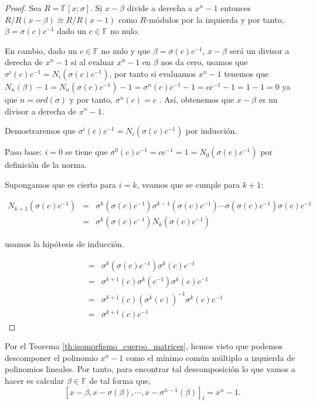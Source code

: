 \begin{proof}
    Sea $R = \mathbb{F}[x;\sigma] $. Si $x - \beta$ divide a derecha a $x^n-1$ entonces $R/R(x-\beta) \cong R/R(x-1) $ como $R$-módulos por la izquierda y por tanto, $\beta = \sigma(c)c^{-1}$ dado un $c \in \mathbb{F}$ no nulo. 
    
    En cambio, dado un $c \in \mathbb{F}$ no nulo y que $\beta = \sigma(c)c^{-1}$, $x-\beta$ será un divisor a derecha de $x^n-1$ si al evaluar $x^n-1$ en $\beta$ nos da cero,  usamos que $\sigma^i(c)c^{-1} = N_i(\sigma(c)c^{-1})$, por tanto si evaluamos $x^n-1$ tenemos que $N_n(\beta)-1 = N_n(\sigma(c)c^{-1}) - 1 = \sigma^n(c)c^{-1} - 1 = cc^{-1} - 1 = 1 - 1 = 0$ ya que $n = ord(\sigma)$ y por tanto, $\sigma^n(c) = c$ . Así, obtenemos que $x -\beta$ es un divisor a derecha de $x^n-1$.

    Demostraremos que $\sigma^i(c)c^{-1} = N_i(\sigma(c)c^{-1})$ por inducción.

    Paso base: $i = 0$ se tiene que $\sigma^0(c)c^{-1} = cc^{-1} = 1 = N_0(\sigma(c)c^{-1})$ por definición de la norma.

    Supongamos que es cierto para $i=k$, veamos que se cumple para $k+1$:

\begin{eqnarray*}
    N_{k+1}(\sigma(c)c^{-1}) & = & \sigma^{k}(\sigma(c)c^{-1})\sigma^{k-1}(\sigma(c)c^{-1})\cdots \sigma(\sigma(c)c^{-1})\sigma(c)c^{-1} \\
    & = & \sigma^k(\sigma(c)c^{-1})N_k(\sigma(c)c^{-1})
\end{eqnarray*}

usamos la hipótesis de inducción.

\begin{eqnarray*}
    & = & \sigma^k(\sigma(c)c^{-1})\sigma^k(c)c^{-1} \\
    & = & \sigma^{k+1}(c)\sigma^k(c^{-1})\sigma^k(c)c^{-1} \\
    & = & \sigma^{k+1}(c)(\sigma^k(c))^{-1}\sigma^k(c)c^{-1} \\
    & = & \sigma^{k+1}(c)c^{-1}
\end{eqnarray*}
\end{proof}


Por el Teorema \ref{th:isomorfismo_cuerpo_matrices}, hemos visto que podemos descomponer el polinomio $x^n-1$ como el mínimo común múltiplo a izquierda de polinomios lineales. Por tanto, para encontrar tal descomposición lo que vamos a hacer es calcular $\beta \in \mathbb{F}$ de tal forma que,
\[ [x-\beta,x-\sigma(\beta),\cdots,x-\sigma^{n-1}(\beta)]_l = x^n-1.\]

